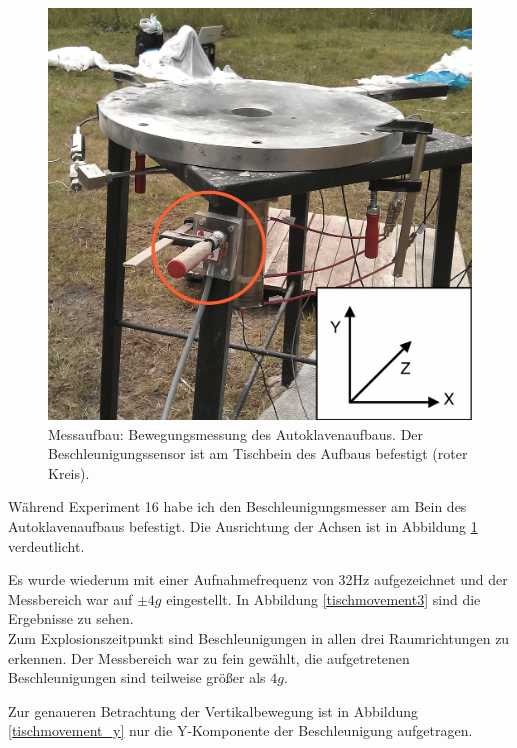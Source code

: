\documentclass[12pt,a4paper,twoside,BCOR=12.5mm]{scrartcl}
\begin{document}
\begin{figure}[H]
\centering
\includegraphics[scale=.13]{hardwareimages/tisch.jpg}
\caption{Messaufbau: Bewegungsmessung des Autoklavenaufbaus. Der Beschleunigungssensor ist am Tischbein des Aufbaus befestigt (roter Kreis).}
\label{tisch}
\end{figure}

Während Experiment 16 habe ich den Beschleunigungsmesser am Bein des Autoklavenaufbaus befestigt. Die Ausrichtung der Achsen ist in Abbildung \ref{tisch} verdeutlicht.

Es wurde wiederum mit einer Aufnahmefrequenz von 32Hz aufgezeichnet und der Messbereich war auf $\pm 4g$ eingestellt.
In Abbildung \ref{tischmovement3} sind die Ergebnisse zu sehen.\\

Zum Explosionszeitpunkt sind Beschleunigungen in allen drei Raumrichtungen zu erkennen. Der Messbereich war zu fein gewählt, die aufgetretenen Beschleunigungen sind teilweise größer als $4g$. 

Zur genaueren Betrachtung der Vertikalbewegung ist in Abbildung \ref{tischmovement_y} nur die Y-Komponente der Beschleunigung aufgetragen. 
\end{document}
